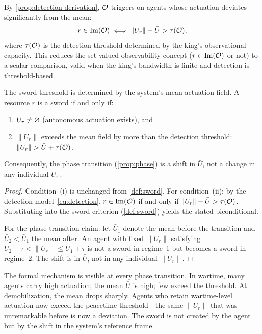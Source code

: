 By \cref{prop:detection-derivation}, $\mathcal{O}$ triggers on agents
whose actuation deviates significantly from the mean:
\begin{equation}\label{eq:detection}
  r \in \mathrm{Im}(\mathcal{O})
  \iff
  \|U_r\| - \bar{U} > \tau(\mathcal{O}),
\end{equation}
where $\tau(\mathcal{O})$ is the detection threshold determined by the king's
observational capacity.  This reduces the set-valued observability
concept ($r \in \mathrm{Im}(\mathcal{O})$ or not) to a scalar comparison,
valid when the king's bandwidth is finite and detection is
threshold-based.

\begin{theorem}\label{thm:meanfield}
The sword threshold is determined by the system's mean actuation field.
A resource $r$ is a sword if and only if:
\begin{enumerate}[label=(\roman*)]
  \item $U_r \neq \varnothing$ (autonomous actuation exists), and
  \item $\|U_r\|$ exceeds the mean field by more than the detection
  threshold: $\|U_r\| > \bar{U} + \tau(\mathcal{O})$.
\end{enumerate}
Consequently, the phase transition (\cref{prop:phase}) is a shift in
$\bar{U}$, not a change in any individual $U_r$.
\end{theorem}

\begin{proof}
Condition~(i) is unchanged from \cref{def:sword}.
For condition~(ii): by the detection model~\eqref{eq:detection},
$r \in \mathrm{Im}(\mathcal{O})$ if and only if
$\|U_r\| - \bar{U} > \tau(\mathcal{O})$.  Substituting into the sword
criterion (\cref{def:sword}) yields the stated biconditional.

For the phase-transition claim: let $\bar{U}_1$ denote the mean
before the transition and $\bar{U}_2 < \bar{U}_1$ the mean after.
An agent with fixed $\|U_r\|$ satisfying
$\bar{U}_2 + \tau < \|U_r\| \leq \bar{U}_1 + \tau$
is not a sword in regime~1 but becomes a sword in regime~2.
The shift is in $\bar{U}$, not in any individual $\|U_r\|$.
\end{proof}

\begin{remark}\label{rem:meanfield-history}
The formal mechanism is visible at every phase transition.
In wartime, many agents carry high actuation; the mean $\bar{U}$ is
high; few exceed the threshold. At demobilization, the mean drops
sharply. Agents who retain wartime-level actuation now exceed the
peacetime threshold---the same $\|U_r\|$ that was unremarkable before
is now a deviation. The sword is not created by the agent but by the
shift in the system's reference frame.
\end{remark}

